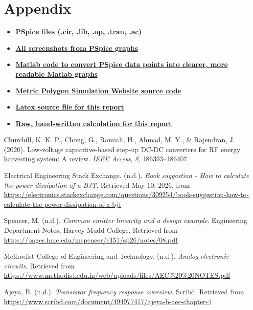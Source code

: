 \documentclass[11pt, a4paper]{article}
\begin{document}
\section*{Appendix}

\begin{itemize}
    \item \href{https://github.com/LimWeiJen/EC-assignment/tree/main/pspice%20simulation}{\textbf{PSpice files (.cir, .lib, .op, .tran, .ac)}}
    \item \href{https://github.com/LimWeiJen/EC-assignment/tree/main/pspice%20simulation%20images}{\textbf{All screenshots from PSpice graphs}}
    \item \href{https://github.com/LimWeiJen/EC-assignment/tree/main/matlab%20plotting%20result}{\textbf{Matlab code to convert PSpice data points into clearer, more readable Matlab graphs}}
    \item \href{https://github.com/LimWeiJen/EC-assignment/tree/main/simulation%20website}{\textbf{Metric Polygon Simulation Website source code}}
    \item \href{https://github.com/LimWeiJen/EC-assignment/blob/main/report.tex}{\textbf{Latex source file for this report}}
    \item \href{https://github.com/LimWeiJen/EC-assignment/blob/main/raw%20handwritten%20calculation.pdf}{\textbf{Raw, hand-written calculation for this report}}
\end{itemize}

\begin{thebibliography}{9}

Churchill, K. K. P., Chong, G., Ramiah, H., Ahmad, M. Y., \& Rajendran, J. (2020). Low-voltage capacitive-based step-up DC-DC converters for RF energy harvesting system: A review. \textit{IEEE Access}, \textit{8}, 186393--186407.

Electrical Engineering Stack Exchange. (n.d.). \textit{Book suggestion - How to calculate the power dissipation of a BJT}. Retrieved May 10, 2026, from \url{https://electronics.stackexchange.com/questions/309254/book-suggestion-how-to-calculate-the-power-dissipation-of-a-bjt}

Spencer, M. (n.d.). \textit{Common emitter linearity and a design example}. Engineering Department Notes, Harvey Mudd College. Retrieved from \url{https://pages.hmc.edu/mspencer/e151/sp26/notes/08.pdf}

Methodist College of Engineering and Technology. (n.d.). \textit{Analog electronic circuits}. Retrieved from \url{https://www.methodist.edu.in/web/uploads/files/AEC%20%20NOTES.pdf}

Ajeya, B. (n.d.). \textit{Transistor frequency response overview}. Scribd. Retrieved from \url{https://www.scribd.com/document/494977417/ajeya-b-aec-chapter-4}

\end{thebibliography}
\end{document}

